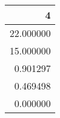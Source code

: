 \begin{tabular}{r}
\toprule
4 \\
\midrule
22.000000 \\
15.000000 \\
0.901297 \\
0.469498 \\
0.000000 \\
\bottomrule
\end{tabular}
